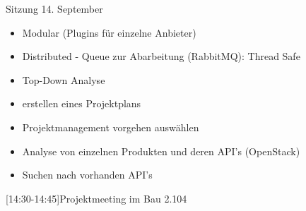 
\begin{Protokoll}{Sitzung 14. September}
\protokollKopf

\begin{itemize}
  \item Modular (Plugins für einzelne Anbieter)
  \item Distributed - Queue zur Abarbeitung (RabbitMQ): Thread Safe
  \item Top-Down Analyse
\end{itemize}
\begin{itemize}
  \item erstellen eines Projektplans
  \item Projektmanagement vorgehen auswählen
\end{itemize}
\begin{itemize}
  \item Analyse von einzelnen Produkten und deren API's (OpenStack)
  \item Suchen nach vorhanden API's
\end{itemize}

[14:30-14:45]{Projektmeeting im Bau 2.104}



\end{Protokoll}
